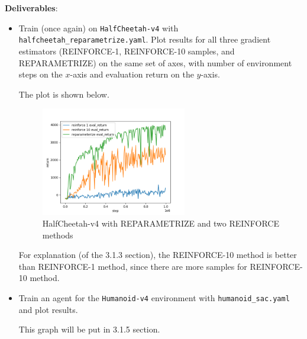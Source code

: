 \textbf{Deliverables}: 
\begin{itemize}
    \item Train (once again) on \verb|HalfCheetah-v4| with \verb|halfcheetah_reparametrize.yaml|. Plot results for all three gradient estimators (REINFORCE-1, REINFORCE-10 samples, and REPARAMETRIZE) on the same set of axes, with number of environment steps on the $x$-axis and evaluation return on the $y$-axis.

\MYSOLUTION The plot is shown below.

\begin{figure}[H]
    \centering
    \includegraphics[width=0.6\textwidth]{../report/assets/P3-1-4-2.png}
    \caption{HalfCheetah-v4 with REPARAMETRIZE and two REINFORCE methods}
    \label{fig:halfcheetah-v4-reparametrize}
\end{figure}

For explanation (of the 3.1.3 section), the REINFORCE-10 method is better than REINFORCE-1 method, since there are more samples for REINFORCE-10 method.

    \item Train an agent for the \verb|Humanoid-v4| environment with \verb|humanoid_sac.yaml| and plot results.
    
\MYSOLUTION

This graph will be put in 3.1.5 section.

\end{itemize}

